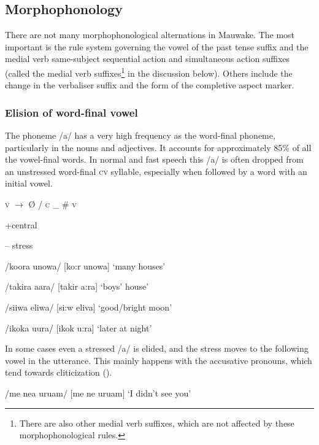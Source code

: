 \subsection{Morphophonology}

There are not many morphophonological alternations in Mauwake.  The most important is the rule system governing the vowel of the past tense suffix and the medial verb same-subject sequential action and simultaneous action suffixes (called the medial verb suffixes\footnote{There are also other medial verb suffixes, which are not  affected by these morphophonological rules.} in the discussion below).  Others include the change in the verbaliser suffix and the form of the completive aspect marker.

\subsubsection{Elision of word-final vowel}

The phoneme /a/ has a very high frequency as the word-final phoneme, particularly in the nouns and adjectives.  It accounts for approximately 85\% of all the vowel-final words.  In normal and fast speech this /a/ is often dropped from an unstressed word-final \textsc{cv} syllable, especially when followed by a word with an initial vowel. 

\textsc{v}    $\rightarrow $    {\O}  /  \textsc{c} \_  \#  \textsc{v}

+central

-- stress

/koora unowa/  [{{\textprimstress}ko:r  u{{\textprimstress}}nowa}]  `many houses'

/takira {\textphi}aara/  [ta{{\textprimstress}kir  {{\textprimstress}}}{\textphi}a:ra]  `boys' house'

/siiwa eliwa/  [{{\textprimstress}si:w  e{{\textprimstress}}liva}]  `good/bright moon'

/ikoka uura/  [i{{\textprimstress}kok  {{\textprimstress}}u:ra}]  `later at night'

In some cases even a stressed /a/ is elided, and the stress moves to the following vowel in the utterance.  This mainly happens with the accusative pronouns, which tend towards cliticization ().

/me ne{\textphi}a uru{\textphi}am/  [{{\textprimstress}me ne}{\textphi} {{\textprimstress}uru}{\textphi}am]  `I didn't see you'

